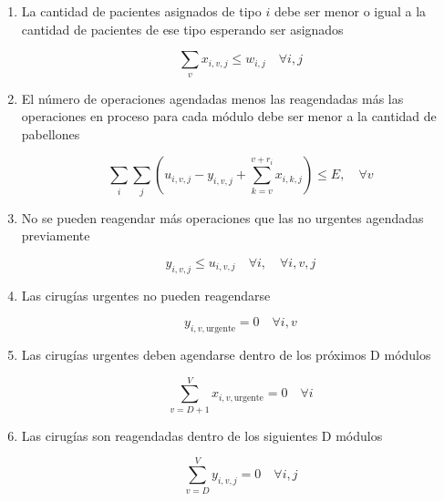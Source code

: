 \documentclass[letterpaper,10pt]{article}
\begin{document}
    
    \begin{enumerate}
        \item La cantidad de pacientes asignados de tipo $i$ debe ser menor o igual a la cantidad de pacientes de ese tipo esperando ser asignados
    
        $$\sum\limits_{v}x_{i,v,j} \leq w_{i,j} \quad \forall i,j$$
        
        \item El número de operaciones agendadas menos las reagendadas más las operaciones en proceso para cada módulo debe ser menor a la cantidad de pabellones
    
        
        
        $$\sum\limits_{i}\sum\limits_{j} (u_{i,v,j} - y_{i,v,j} + \sum\limits_{k = v}^{v + r_i} x_{i,k,j}) \leq E, \quad \forall v$$
        
        \item No se pueden reagendar más operaciones que las no urgentes agendadas previamente
    
        $$y_{i,v,j} \le u_{i,v,j} \quad \forall i, \quad \forall i,v,j$$
        
        \item Las cirugías urgentes no pueden reagendarse
    
        $$y_{i,v,\text{urgente}} = 0 \quad \forall i,v$$
        
        \item Las cirugías urgentes deben agendarse dentro de los próximos D módulos
        
        $$\sum\limits_{v=D+1}^{V}x_{i,v,\text{urgente}} = 0 \quad \forall i$$
        
        \item Las cirugías son reagendadas dentro de los siguientes D módulos
        
        $$\sum\limits_{v=D}^{V}y_{i,v,j} = 0 \quad \forall i,j$$
        
    
    
  
    \end{enumerate}
    
\end{document}
